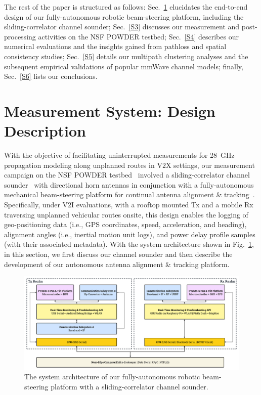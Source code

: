 \documentclass[12pt, draftcls, onecolumn]{IEEEtran}
\begin{document}
The rest of the paper is structured as follows: Sec.~\ref{S2} elucidates the end-to-end design of our fully-autonomous robotic beam-steering platform, including the sliding-correlator channel sounder; Sec.~\ref{S3} discusses our measurement and post-processing activities on the NSF POWDER testbed; Sec.~\ref{S4} describes our numerical evaluations and the insights gained from pathloss and spatial consistency studies; Sec.~\ref{S5} details our multipath clustering analyses and the subsequent empirical validations of popular mmWave channel models; finally, Sec.~\ref{S6} lists our conclusions.
\vspace{-9mm}

\section{Measurement System: Design Description}\label{S2}
With the objective of facilitating uninterrupted measurements for \SI{28}{\giga\hertz} propagation modeling along unplanned routes in V$2$X settings, our measurement campaign on the NSF POWDER testbed~\cite{POWDER} involved a sliding-correlator channel sounder~\cite{Purdue} with directional horn antennas in conjunction with a fully-autonomous mechanical beam-steering platform for continual antenna alignment \& tracking~\cite{SPAVE_NRSM}. Specifically, under V$2$I evaluations, with a rooftop mounted Tx and a mobile Rx traversing unplanned vehicular routes onsite, this design enables the logging of geo-positioning data (i.e., GPS coordinates, speed, acceleration, and heading), alignment angles (i.e., inertial motion unit logs), and power delay profile samples (with their associated metadata). With the system architecture shown in Fig.~\ref{F1}, in this section, we first discuss our channel sounder and then describe the development of our autonomous antenna alignment \& tracking platform.
\begin{figure} [t]
    \centering
    \includegraphics[width=1.0\textwidth]{figs/system_architecture.pdf}
    \vspace{-8mm}
    \caption{The system architecture of our fully-autonomous robotic beam-steering platform with a sliding-correlator channel sounder.}
    \label{F1}
\end{figure}
\end{document}
